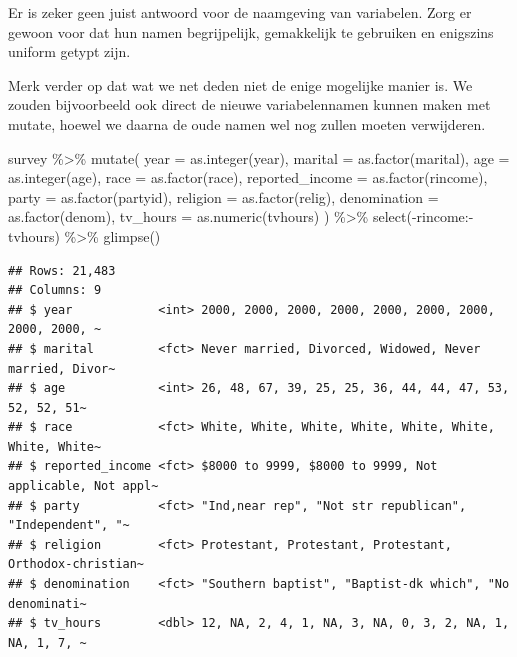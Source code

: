 \documentclass[]{tufte-book}
\newenvironment{Shaded}{}{}
\newcommand{\AttributeTok}[1]{\textcolor[rgb]{0.49,0.56,0.16}{#1}}
\newcommand{\FunctionTok}[1]{\textcolor[rgb]{0.02,0.16,0.49}{#1}}
\newcommand{\NormalTok}[1]{#1}
\newcommand{\SpecialCharTok}[1]{\textcolor[rgb]{0.25,0.44,0.63}{#1}}
\begin{document}
Er is zeker geen juist antwoord voor de naamgeving van variabelen. Zorg er gewoon voor dat hun namen begrijpelijk, gemakkelijk te gebruiken en enigszins uniform getypt zijn.

Merk verder op dat wat we net deden niet de enige mogelijke manier is. We zouden bijvoorbeeld ook direct de nieuwe variabelennamen kunnen maken met mutate, hoewel we daarna de oude namen wel nog zullen moeten verwijderen.

\begin{Shaded}
\begin{Highlighting}[]
\NormalTok{survey }\SpecialCharTok{\%\textgreater{}\%}
  \FunctionTok{mutate}\NormalTok{(}
    \AttributeTok{year =} \FunctionTok{as.integer}\NormalTok{(year),}
    \AttributeTok{marital =} \FunctionTok{as.factor}\NormalTok{(marital),}
    \AttributeTok{age =} \FunctionTok{as.integer}\NormalTok{(age),}
    \AttributeTok{race =} \FunctionTok{as.factor}\NormalTok{(race),}
    \AttributeTok{reported\_income =} \FunctionTok{as.factor}\NormalTok{(rincome),}
    \AttributeTok{party =} \FunctionTok{as.factor}\NormalTok{(partyid),}
    \AttributeTok{religion =} \FunctionTok{as.factor}\NormalTok{(relig),}
    \AttributeTok{denomination =} \FunctionTok{as.factor}\NormalTok{(denom),}
    \AttributeTok{tv\_hours =} \FunctionTok{as.numeric}\NormalTok{(tvhours)}
\NormalTok{  ) }\SpecialCharTok{\%\textgreater{}\%}
  \FunctionTok{select}\NormalTok{(}\SpecialCharTok{{-}}\NormalTok{rincome}\SpecialCharTok{:{-}}\NormalTok{tvhours) }\SpecialCharTok{\%\textgreater{}\%}
  \FunctionTok{glimpse}\NormalTok{()}
\end{Highlighting}
\end{Shaded}

\begin{verbatim}
## Rows: 21,483
## Columns: 9
## $ year            <int> 2000, 2000, 2000, 2000, 2000, 2000, 2000, 2000, 2000, ~
## $ marital         <fct> Never married, Divorced, Widowed, Never married, Divor~
## $ age             <int> 26, 48, 67, 39, 25, 25, 36, 44, 44, 47, 53, 52, 52, 51~
## $ race            <fct> White, White, White, White, White, White, White, White~
## $ reported_income <fct> $8000 to 9999, $8000 to 9999, Not applicable, Not appl~
## $ party           <fct> "Ind,near rep", "Not str republican", "Independent", "~
## $ religion        <fct> Protestant, Protestant, Protestant, Orthodox-christian~
## $ denomination    <fct> "Southern baptist", "Baptist-dk which", "No denominati~
## $ tv_hours        <dbl> 12, NA, 2, 4, 1, NA, 3, NA, 0, 3, 2, NA, 1, NA, 1, 7, ~
\end{verbatim}
\end{document}
